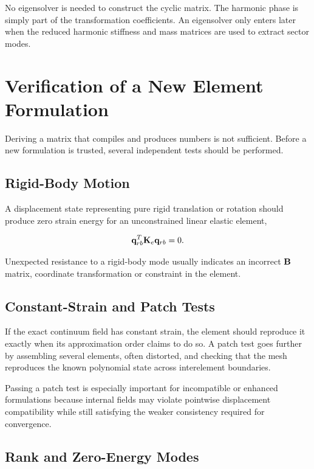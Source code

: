 No eigensolver is needed to construct the cyclic matrix. The harmonic phase is
simply part of the transformation coefficients. An eigensolver only enters
later when the reduced harmonic stiffness and mass matrices are used to extract
sector modes.

\section{Verification of a New Element Formulation}

Deriving a matrix that compiles and produces numbers is not sufficient. Before a
new formulation is trusted, several independent tests should be performed.

\subsection{Rigid-Body Motion}

A displacement state representing pure rigid translation or rotation should
produce zero strain energy for an unconstrained linear elastic element,

\begin{equation}
    \mathbf{q}_{rb}^T\mathbf{K}_e\mathbf{q}_{rb}=0.
\end{equation}

Unexpected resistance to a rigid-body mode usually indicates an incorrect
$\mathbf{B}$ matrix, coordinate transformation or constraint in the element.

\subsection{Constant-Strain and Patch Tests}

If the exact continuum field has constant strain, the element should reproduce
it exactly when its approximation order claims to do so. A patch test goes
further by assembling several elements, often distorted, and checking that the
mesh reproduces the known polynomial state across interelement boundaries.

Passing a patch test is especially important for incompatible or enhanced
formulations because internal fields may violate pointwise displacement
compatibility while still satisfying the weaker consistency required for
convergence.

\subsection{Rank and Zero-Energy Modes}

